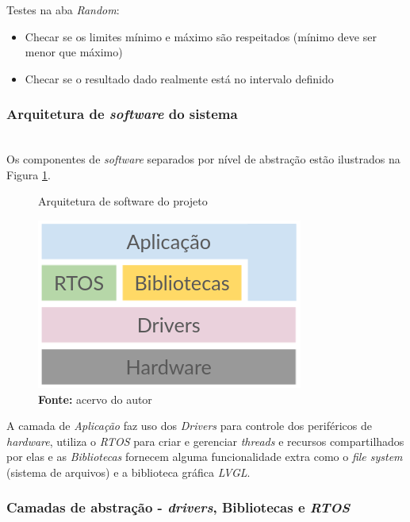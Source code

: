 \documentclass[times, twoside, watermark]{artigo}
\begin{document}
Testes na aba \textit{Random}:

\begin{itemize}
\itemsep0em 
\item Checar se os limites mínimo e máximo são respeitados (mínimo deve ser menor que máximo)
\item Checar se o resultado dado realmente está no intervalo definido
\end{itemize}

\subsubsection{Arquitetura de \textit{software} do sistema}\hfill\\

Os componentes de \textit{software} separados por nível de abstração estão ilustrados
na Figura \ref{fig:arch2}.\hfill\\

\begin{figure}[H]
  \centering
  \caption{Arquitetura de software do projeto}
  \includegraphics[width=0.9\linewidth]{images/arch2.png}
  \caption*{\newline\textbf{Fonte:} acervo do autor}
  \label{fig:arch2}
\end{figure}

A camada de \textit{Aplicação} faz uso dos \textit{Drivers} para controle dos
periféricos de \textit{hardware}, utiliza o \textit{RTOS} para criar e gerenciar
\textit{threads} e recursos compartilhados por elas e as \textit{Bibliotecas}
fornecem alguma funcionalidade extra como o \textit{file system} (sistema de 
arquivos) e a biblioteca gráfica \textit{LVGL}.

\subsubsection{Camadas de abstração - \textit{drivers}, Bibliotecas e \textit{RTOS}}\hfill\\
\end{document}
